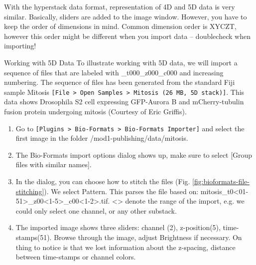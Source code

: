 With the hyperstack data format, representation of 4D and 5D data is very similar. Basically, sliders are added to the image window. However, you have to keep the order of dimensions in mind. Common dimension order is XYCZT, however this order might be different when you import data -- doublecheck when importing!

\begin{taskbox}{Working with 5D Data}
To illustrate working with 5D data, we will import a sequence of files that are labeled with \_t000\_z000\_c000 and increasing numbering. The sequence of files has been generated from the standard Fiji sample Mitosis \texttt{[File > Open Samples > Mitosis (26 MB, 5D stack)]}. This data shows Drosophila S2 cell expressing GFP-Aurora B and mCherry-tubulin fusion protein undergoing mitosis (Courtesy of Eric Griffis).

\begin{enumerate}
	\item Go to \texttt{[Plugins > Bio-Formats > Bio-Formats Importer]} and select the first image in the folder /mod1-publishing/data/mitosis.
	\item The Bio-Formats import options dialog shows up, make sure to select [Group files with similar names].
	\item In the dialog, you can choose how to stitch the files (Fig. \ref{fig:bioformats-file-stitching}). We select Pattern. This parses the file based on: mitosis\_t0<01-51>\_z00<1-5>\_c00<1-2>.tif. <> denote the range of the import, e.g. we could only select one channel, or any other substack.
	
	\begin{minipage}[t]{\linewidth}
		\begin{center}
		\medskip
		\label{fig:bioformats-file-stitching}
		\end{center}
	\end{minipage}
	
	\item The imported image shows three sliders: channel (2), z-position(5), time-stamps(51). Browse through the image, adjust Brightness if necessary. On thing to notice is that we lost information about the z-spacing, distance between time-stamps or channel colors.
\end{enumerate}

\end{taskbox}

